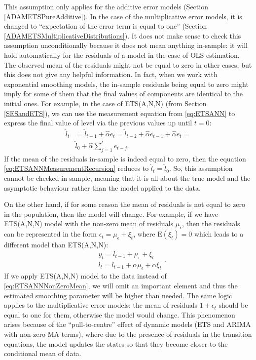 \documentclass[
]{book}
\theoremstyle{definition}
\theoremstyle{definition}
\theoremstyle{definition}
\theoremstyle{definition}
\theoremstyle{remark}
\begin{document}
This assumption only applies for the additive error models (Section \ref{ADAMETSPureAdditive}). In the case of the multiplicative error models, it is changed to ``expectation of the error term is equal to one'' (Section \ref{ADAMETSMultiplicativeDistributions}). It does not make sense to check this assumption unconditionally because it does not mean anything in-sample: it will hold automatically for the residuals of a model in the case of OLS estimation. The observed mean of the residuals might not be equal to zero in other cases, but this does not give any helpful information. In fact, when we work with exponential smoothing models, the in-sample residuals being equal to zero might imply for some of them that the final values of components are identical to the initial ones. For example, in the case of ETS(A,N,N) (from Section \ref{SESandETS}), we can use the measurement equation from \eqref{eq:ETSANN} to express the final value of level via the previous values up until \(t=0\):
\begin{equation}
    \begin{aligned}
        \hat{l}_t &= \hat{l}_{t-1} + \hat{\alpha} e_t = \hat{l}_{t-2} + \hat{\alpha} e_{t-1} + \hat{\alpha} e_t = \\
        & \hat{l}_0 + \hat{\alpha} \sum_{j=1}^t e_{t-j} .
    \end{aligned}
    \label{eq:ETSANNMeasurementRecursion}
\end{equation}
If the mean of the residuals in-sample is indeed equal to zero, then the equation \eqref{eq:ETSANNMeasurementRecursion} reduces to \(\hat{l}_t=\hat{l}_0\). So, this assumption cannot be checked in-sample, meaning that it is all about the true model and the asymptotic behaviour rather than the model applied to the data.

On the other hand, if for some reason the mean of residuals is not equal to zero in the population, then the model will change. For example, if we have ETS(A,N,N) model with the non-zero mean of residuals \(\mu_\epsilon\), then the residuals can be represented in the form \(\epsilon_t = \mu_\epsilon + \xi_t\), where \(\mathrm{E}(\xi_t)=0\) which leads to a different model than ETS(A,N,N):
\begin{equation}
    \begin{aligned}
        & y_t = l_{t-1} + \mu_\epsilon + \xi_t \\
        & l_t = l_{t-1} + \alpha \mu_\epsilon + \alpha \xi_t
    \end{aligned}.
    \label{eq:ETSANNNonZeroMean}
\end{equation}
If we apply ETS(A,N,N) model to the data instead of \eqref{eq:ETSANNNonZeroMean}, we will omit an important element and thus the estimated smoothing parameter will be higher than needed. The same logic applies to the multiplicative error models: the mean of residuals \(1+\epsilon_t\) should be equal to one for them, otherwise the model would change. This phenomenon arises because of the ``pull-to-centre'' effect of dynamic models (ETS and ARIMA with non-zero MA terms), where due to the presence of residuals in the transition equations, the model updates the states so that they become closer to the conditional mean of data.
\end{document}
